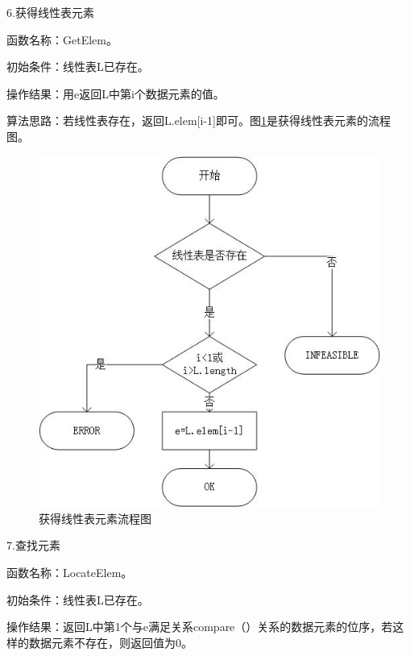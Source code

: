 \documentclass[supercite]{Experimental_Report}
\theoremstyle{definition}
\begin{document}
6.获得线性表元素

函数名称：GetElem。

初始条件：线性表L已存在。

操作结果：用e返回L中第i个数据元素的值。

算法思路：若线性表存在，返回L.elem[i-1]即可。图\ref{fig1-6}是获得线性表元素的流程图。
\begin{figure}[htb] %
	\begin{center}
		\includegraphics[scale=1]{./images/顺序表/getelem.jpg}
		\caption{获得线性表元素流程图}
		\label{fig1-6}
	\end{center}
\end{figure}

\newpage

7.查找元素

函数名称：LocateElem。

初始条件：线性表L已存在。

操作结果：返回L中第1个与e满足关系compare（）关系的数据元素的位序，若这样的数据元素不存在，则返回值为0。
\end{document}
